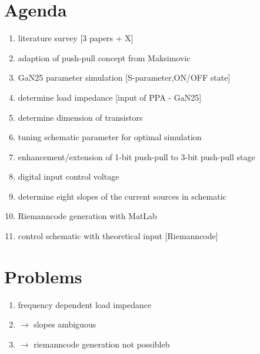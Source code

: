 \documentclass[10pt,a4paper]{report}
\begin{document}
\section*{Agenda}
\begin{enumerate}
	\item literature survey [3 papers + X]
	\item adaption of push-pull concept from Maksimovic
	\item GaN25 parameter simulation [S-parameter,ON/OFF state]
	\item determine load impedance [input of PPA - GaN25]
	\item determine dimension of transistors
	\item tuning schematic parameter for optimal simulation
	\item enhancement/extension of 1-bit push-pull to 3-bit push-pull stage
	\item digital input control voltage
	\item determine eight slopes of the current sources in schematic
	\item Riemanncode generation with MatLab
	\item control schematic with theoretical input [Riemanncode]
\end{enumerate}

\section*{Problems}
\begin{enumerate}
	\item frequency dependent load impedance
	\item $\rightarrow$ slopes ambiguous
	\item $\rightarrow$ riemanncode generation not possibleb                                                                                                                                                                                                                                                                                                                                                                                                                                                                                                                                                                                                                                                                                                                                                                                                                                                                                                                                                                                                                                                                                                                                                                                                                                                                                                                                                                                                                                                                
\end{enumerate}
\end{document}
